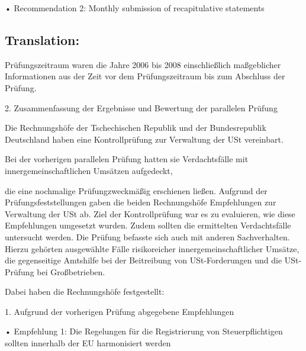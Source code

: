 \documentclass[10pt]{article}
\begin{document}
• Recommendation 2: Monthly submission of recapitulative statements



\pagebreak

\subsection*{Translation:}

Prüfungszeitraum waren die Jahre 2006 bis 2008 einschließlich maßgeblicher Informationen aus der Zeit vor dem Prüfungszeitraum bis zum Abschluss der Prüfung.


2. Zusammenfassung der Ergebnisse und Bewertung der parallelen Prüfung 

Die Rechnungshöfe der Tschechischen Republik und der Bundesrepublik Deutschland haben eine Kontrollprüfung zur Verwaltung der USt vereinbart.


Bei der vorherigen parallelen Prüfung hatten sie Verdachtsfälle mit innergemeinschaftlichen Umsätzen aufgedeckt, 

die eine nochmalige Prüfungzweckmäßig erschienen ließen.
Aufgrund der Prüfungsfeststellungen gaben die beiden Rechnungshöfe Empfehlungen zur Verwaltung der USt ab.
Ziel der Kontrollprüfung war es zu evaluieren, wie diese Empfehlungen umgesetzt wurden. Zudem sollten die ermittelten Verdachtsfälle untersucht werden.
Die Prüfung befasste sich auch mit anderen Sachverhalten. Hierzu gehörten ausgewählte Fälle risikoreicher innergemeinschaftlicher Umsätze, die gegenseitige Amtshilfe bei der Beitreibung von USt-Forderungen und die USt-Prüfung bei Großbetrieben.


Dabei haben die Rechnungshöfe festgestellt: 



1. Aufgrund der vorherigen Prüfung abgegebene Empfehlungen 



• Empfehlung 1: Die Regelungen für die Registrierung von Steuerpflichtigen sollten innerhalb der EU harmonisiert werden 
\end{document}
